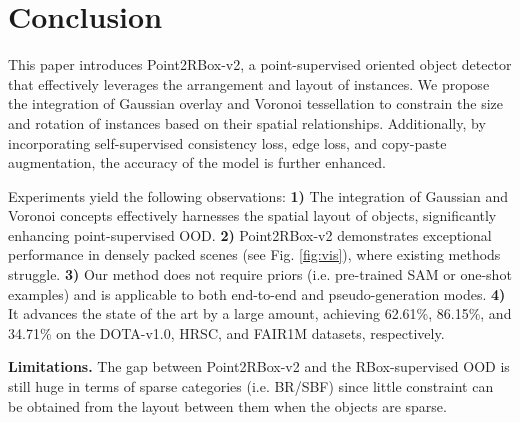 \section{Conclusion}
\label{sec:conclusion}

This paper introduces Point2RBox-v2, a point-supervised oriented object detector that effectively leverages the arrangement and layout of instances. We propose the integration of Gaussian overlay and Voronoi tessellation to constrain the size and rotation of instances based on their spatial relationships. Additionally, by incorporating self-supervised consistency loss, edge loss, and copy-paste augmentation, the accuracy of the model is further enhanced.

Experiments yield the following observations: 
\textbf{1)} The integration of Gaussian and Voronoi concepts effectively harnesses the spatial layout of objects, significantly enhancing point-supervised OOD. 
\textbf{2)} Point2RBox-v2 demonstrates exceptional performance in densely packed scenes (see Fig. \ref{fig:vis}), where existing methods struggle. 
\textbf{3)} Our method does not require priors (i.e. pre-trained SAM or one-shot examples) and is applicable to both end-to-end and pseudo-generation modes.
\textbf{4)} It advances the state of the art by a large amount, achieving 62.61\%, 86.15\%, and 34.71\% on the DOTA-v1.0, HRSC, and FAIR1M datasets, respectively.

\textbf{Limitations.} The gap between Point2RBox-v2 and the RBox-supervised OOD is still huge in terms of sparse categories (i.e. BR/SBF) since little constraint can be obtained from the layout between them when the objects are sparse.